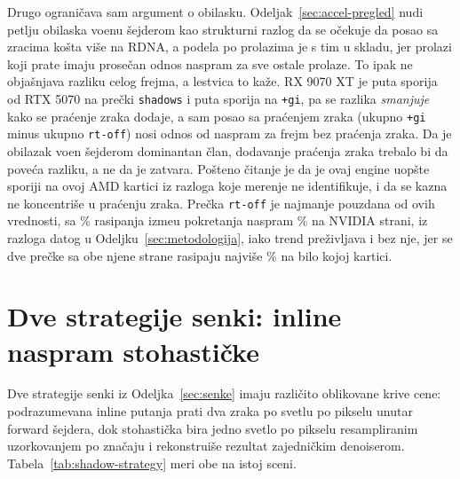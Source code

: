 Drugo ograni\v{c}ava sam argument o obilasku. Odeljak~\ref{sec:accel-pregled} nudi
petlju obilaska vo\dj enu \v{s}ejderom kao strukturni razlog da se o\v{c}ekuje da posao sa zracima ko\v{s}ta vi\v{s}e na RDNA,
a podela po prolazima je s tim u skladu, jer prolazi koji prate imaju prose\v{c}an odnos \perfVendorTracingMean{} naspram
\perfVendorOtherMean{} za sve ostale prolaze. To ipak ne obja\v{s}njava razliku celog frejma, a
lestvica to ka\v{z}e. RX 9070 XT je \perfLadderRatioShadows{} puta sporija od RTX 5070 na pre\v{c}ki \texttt{shadows}
i \perfLadderRatioGi{} puta sporija na \texttt{+gi}, pa se razlika \emph{smanjuje} kako se pra\'cenje zraka dodaje, a
sam posao sa pra\'cenjem zraka (ukupno \texttt{+gi} minus ukupno \texttt{rt-off}) nosi odnos od
\perfRtOnlyRatio{} naspram \perfLadderRatioBase{} za frejm bez pra\'cenja zraka. Da je obilazak vo\dj en \v{s}ejderom
dominantan \v{c}lan, dodavanje pra\'cenja zraka trebalo bi da pove\'ca razliku, a ne da je zatvara. Po\v{s}teno \v{c}itanje je
da je ovaj engine uop\v{s}te sporiji na ovoj AMD kartici iz razloga koje merenje ne identifikuje,
i da se kazna ne koncentri\v{s}e u pra\'cenju zraka. Pre\v{c}ka \texttt{rt-off} je najmanje
pouzdana od ovih vrednosti, sa \perfSpreadBaseAMD{}\% rasipanja izme\dj{}u pokretanja naspram \perfSpreadBaseNV{}\% na NVIDIA strani, iz
razloga datog u Odeljku~\ref{sec:metodologija}, iako trend pre\v{z}ivljava i bez nje, jer se dve
pre\v{c}ke sa obe njene strane rasipaju najvi\v{s}e \perfSpreadNeighbourMax{}\% na bilo kojoj kartici.

\section{Dve strategije senki: inline naspram stohasti\v{c}ke}
\label{sec:analiza-shadow-strategy}

Dve strategije senki iz Odeljka~\ref{sec:senke} imaju razli\v{c}ito oblikovane krive cene: podrazumevana
inline putanja prati dva zraka po svetlu po pikselu unutar forward \v{s}ejdera, dok stohasti\v{c}ka
bira jedno svetlo po pikselu resampliranim uzorkovanjem po zna\v{c}aju i rekonstrui\v{s}e rezultat zajedni\v{c}kim
denoiserom. Tabela~\ref{tab:shadow-strategy} meri obe na istoj sceni.

\begin{table}[tbp]
\caption[Cena inline naspram stohasti\v{c}kih senki]{Dve strategije senki na istoj sceni sa pet uklju\v{c}enih svetala (GPU ms, delta nad
\texttt{rt-off}).}
\label{tab:shadow-strategy}
\centering

\end{table}

